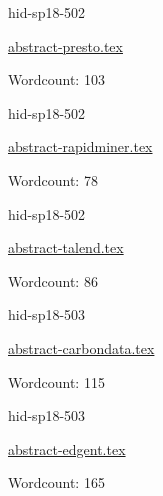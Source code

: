 

\begin{IU}

hid-sp18-502

\href{https://github.com/cloudmesh-community/hid-sp18-502/blob/master//technology/abstract-presto.tex}{abstract-presto.tex}

 

Wordcount: 103

\end{IU}



\begin{IU}

hid-sp18-502

\href{https://github.com/cloudmesh-community/hid-sp18-502/blob/master//technology/abstract-rapidminer.tex}{abstract-rapidminer.tex}

 

Wordcount: 78

\end{IU}



\begin{IU}

hid-sp18-502

\href{https://github.com/cloudmesh-community/hid-sp18-502/blob/master//technology/abstract-talend.tex}{abstract-talend.tex}

 

Wordcount: 86

\end{IU}



\begin{IU}

hid-sp18-503

\href{https://github.com/cloudmesh-community/hid-sp18-503/blob/master//technology/abstract-carbondata.tex}{abstract-carbondata.tex}

 

Wordcount: 115

\end{IU}



\begin{IU}

hid-sp18-503

\href{https://github.com/cloudmesh-community/hid-sp18-503/blob/master//technology/abstract-edgent.tex}{abstract-edgent.tex}

 

Wordcount: 165

\end{IU}

